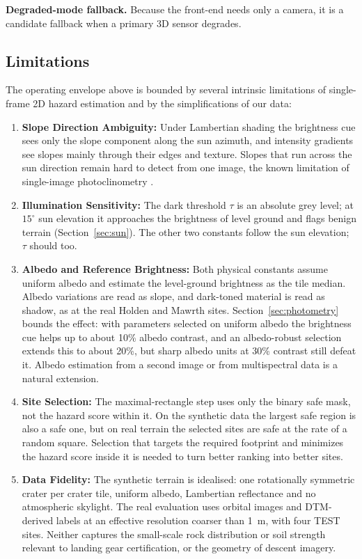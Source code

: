 \documentclass{article}
\begin{document}
\textbf{Degraded-mode fallback.} Because the front-end needs only a camera, it is a candidate fallback when a primary 3D sensor degrades.

\subsection{Limitations}
The operating envelope above is bounded by several intrinsic limitations of single-frame 2D hazard estimation and by the simplifications of our data:
\begin{enumerate}
    \item \textbf{Slope Direction Ambiguity:} Under Lambertian shading the brightness cue sees only the slope component along the sun azimuth, and intensity gradients see slopes mainly through their edges and texture. Slopes that run across the sun direction remain hard to detect from one image, the known limitation of single-image photoclinometry \cite{beyer2003meter}.
    \item \textbf{Illumination Sensitivity:} The dark threshold $\tau$ is an absolute grey level; at $15^\circ$ sun elevation it approaches the brightness of level ground and flags benign terrain (Section~\ref{sec:sun}). The other two constants follow the sun elevation; $\tau$ should too.
    \item \textbf{Albedo and Reference Brightness:} Both physical constants assume uniform albedo and estimate the level-ground brightness as the tile median. Albedo variations are read as slope, and dark-toned material is read as shadow, as at the real Holden and Mawrth sites. Section~\ref{sec:photometry} bounds the effect: with parameters selected on uniform albedo the brightness cue helps up to about 10\% albedo contrast, and an albedo-robust selection extends this to about 20\%, but sharp albedo units at 30\% contrast still defeat it. Albedo estimation from a second image or from multispectral data is a natural extension.
    \item \textbf{Site Selection:} The maximal-rectangle step uses only the binary safe mask, not the hazard score within it. On the synthetic data the largest safe region is also a safe one, but on real terrain the selected sites are safe at the rate of a random square. Selection that targets the required footprint and minimizes the hazard score inside it is needed to turn better ranking into better sites.
    \item \textbf{Data Fidelity:} The synthetic terrain is idealised: one rotationally symmetric crater per crater tile, uniform albedo, Lambertian reflectance and no atmospheric skylight. The real evaluation uses orbital images and DTM-derived labels at an effective resolution coarser than 1~m, with four TEST sites. Neither captures the small-scale rock distribution or soil strength relevant to landing gear certification, or the geometry of descent imagery.
\end{enumerate}
\end{document}
